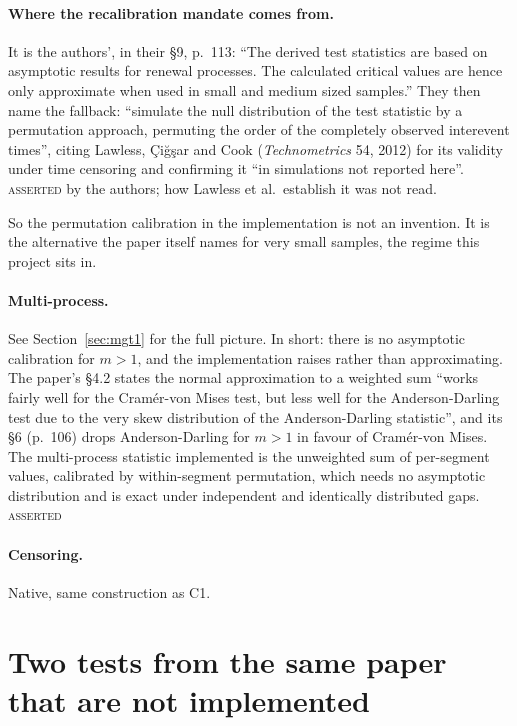 \documentclass[11pt,a4paper]{article}
\newcommand{\ASSERTED}{\textsc{\textcolor{purple!70!black}{asserted}}}
\begin{document}
\paragraph{Where the recalibration mandate comes from.}
It is the authors', in their \S 9, p.~113:
\enquote{The derived test statistics are based on asymptotic results for renewal
processes. The calculated critical values are hence only approximate when used in small
and medium sized samples.} They then name the fallback:
\enquote{simulate the null distribution of the test statistic by a permutation approach,
permuting the order of the completely observed interevent times}, citing Lawless,
Çiğşar and Cook (\emph{Technometrics} 54, 2012) for its validity under time censoring
and confirming it \enquote{in simulations not reported here}. \ASSERTED{} by the authors;
how Lawless et al.\ establish it was not read.

So the permutation calibration in the implementation is not an invention. It is the
alternative the paper itself names for very small samples, the regime this project sits in.

\paragraph{Multi-process.} See Section~\ref{sec:mgt1} for the full picture. In short:
there is no asymptotic calibration for $m > 1$, and the implementation raises rather than
approximating. The paper's \S 4.2 states the normal
approximation to a weighted sum \enquote{works fairly well for the Cramér-von Mises
test, but less well for the Anderson-Darling test due to the very skew distribution of
the Anderson-Darling statistic}, and its \S 6 (p.~106) drops Anderson-Darling for $m > 1$ in
favour of Cramér-von Mises. The multi-process statistic implemented is the unweighted
sum of per-segment values, calibrated by within-segment permutation, which needs no
asymptotic distribution and is exact under independent and identically distributed
gaps. \ASSERTED

\paragraph{Censoring.} Native, same construction as C1.

\section{Two tests from the same paper that are not implemented}
\label{sec:missing}
\end{document}
